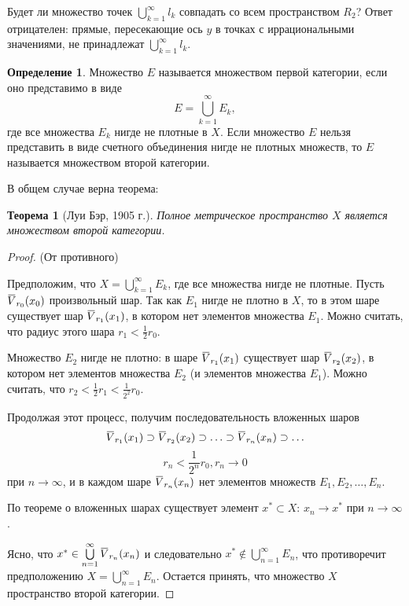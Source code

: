 \documentclass[12pt,a4paper,titlepage,oneside]{book}
\newcommand{\overbar}[1]{\mkern 1.5mu\overline{\mkern-1.5mu#1\mkern-1.5mu}\mkern 1.5mu}
\theoremstyle{definition}
\newtheorem*{definition}{Определение}
\theoremstyle{plain}
\newtheorem*{theorem}{Теорема}
\theoremstyle{remark}
\theoremstyle{remark}
\theoremstyle{remark}
\theoremstyle{remark}
\theoremstyle{plain}
\theoremstyle{plain}
\begin{document}
Будет ли множество точек $\bigcup\limits_{k=1}^\infty l_k$ совпадать со всем пространством $R_2$? Ответ отрицателен: прямые, пересекающие ось $y$ в точках с иррациональными значениями, не принадлежат $\bigcup\limits_{k=1}^\infty l_k$.

\begin{definition}
Множество $E$ называется множеством первой категории, если оно представимо в виде 
$$E=\bigcup\limits_{k=1}^\infty E_k,$$ 
где все множества $E_k$ нигде не плотные в $X$. Если множество $E$ нельзя представить в виде счетного объединения нигде не плотных множеств, то $E$ называется множеством второй категории.
\end{definition}

В общем случае верна теорема:

\begin{theorem}[Луи Бэр, 1905 г.]
Полное метрическое пространство $X$ является множеством второй категории.
\end{theorem}

\begin{proof}
(От противного)

Предположим, что $X=\bigcup\limits_{k=1}^\infty E_k$, где все множества нигде не плотные. Пусть $\overbar{V}_{r_0}(x_0)$ произвольный шар. Так как $E_1$ нигде не плотно в $X$, то в этом шаре существует шар $\overbar{V}_{r_1}(x_1)$, в котором нет элементов множества $E_1$. Можно считать, что радиус этого шара $r_1 < \frac{1}{2}r_0$.

Множество $E_2$ нигде не плотно: в шаре $\overbar{V}_{r_1}(x_1)$ существует шар $\overbar{V}_{r_2}(x_2)$, в котором нет элементов множества $E_2$ (и элементов множества $E_1$). Можно считать, что $r_2 < \frac{1}{2}r_1 < \frac{1}{2^2}r_0$.

Продолжая этот процесс, получим последовательность вложенных шаров 
$$\overbar{V}_{r_1}(x_1) \supset \overbar{V}_{r_2}(x_2) \supset \ldots \supset \overbar{V}_{r_n}(x_n) \supset \ldots$$
$$r_n < \frac{1}{2^n}r_0, r_n \to 0$$
при
$n \to \infty$, и в каждом шаре $\overbar{V}_{r_n}(x_n)$ нет элементов множеств $E_1, E_2, \ldots, E_n$.

По теореме о вложенных шарах существует элемент $x^*\subset X$:
$x_n \to x^*$ при $n \to \infty$.

Ясно, что $x^*\in \bigcup\limits_{n=1}^\infty \overbar{V}_{r_n}(x_n)$ и следовательно $x^*\notin \bigcup\limits_{n=1}^\infty E_n$, что противоречит предположению $X=\bigcup\limits_{n=1}^\infty E_n$. Остается принять, что множество $X$ пространство второй категории.
\end{proof}
\end{document}
